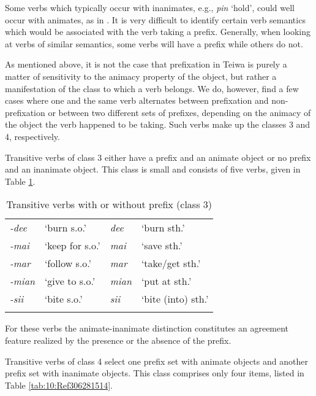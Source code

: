  



       

Some verbs which typically occur with inanimates, e.g., \textit{pin} `hold', could well occur with animates, as in . It is very difficult to identify certain verb semantics which would be associated with the verb taking a prefix. Generally, when looking at verbs of similar semantics, some verbs will have a prefix while others do not.

As mentioned above, it is not the case that prefixation in Teiwa is purely a matter of sensitivity to the animacy property of the object, but rather a manifestation of the class to which a verb belongs. We do, however, find a few cases where one and the same verb alternates between prefixation and non-prefixation or between two different sets of prefixes, depending on the animacy of the object the verb happened to be taking. Such verbs make up the classes 3 and 4, respectively.

Transitive verbs of class 3 either have a prefix and an animate object or no prefix and an inanimate object. This class is small and consists of five verbs, given in Table \ref{tab:10:Ref306281469}.

\begin{table}[h]
\caption{Transitive verbs with or without prefix (class 3)} 
\label{tab:10:Ref306281469}
\begin{tabularx}{\textwidth}{>{\it}XX>{\it}XX}  
\lsptoprule
{-dee}  & `burn s.o.'     & \textit{dee}&  `burn sth.'\\
{-mai}&  `keep for s.o.'  & \textit{mai}&  `save sth.' \\
{-mar}&  `follow s.o.'    & \textit{mar}&  `take/get sth.'\\
{-mian}&  `give to s.o.'  & \textit{mian}&  `put at sth.'\\
{-sii}&  `bite s.o.'     & \textit{sii}&  `bite (into) sth.'\\
\lspbottomrule
\end{tabularx}
\end{table}

For these verbs the animate-inanimate distinction constitutes an agreement feature realized by the presence or the absence of the prefix.

Transitive verbs of class 4 select one prefix set with animate objects and another prefix set with inanimate objects. This class comprises only four items, listed in Table \ref{tab:10:Ref306281514}.




